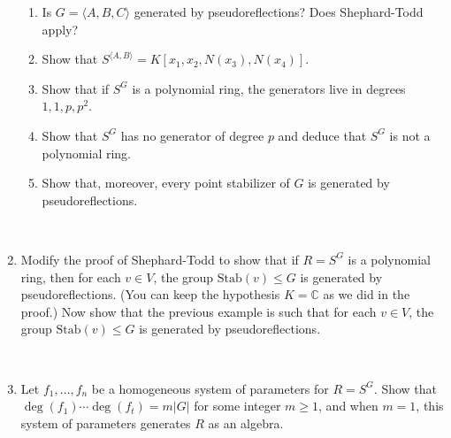 \documentclass[12pt]{amsart}
\theoremstyle{definition}
\numberwithin{equation}{theorem}
\def\CC{\mathbb{C}}
\begin{document}
\begin{enumerate}
\begin{enumerate}
\item Is $G=\langle A,B,C\rangle$ generated by pseudoreflections? Does Shephard-Todd apply?
\item Show that $S^{\langle A,B\rangle} = K[x_1,x_2, N(x_3), N(x_4)]$. 
\item Show that if $S^G$ is a polynomial ring, the generators live in degrees $1,1,p,p^2$.
\item Show that $S^G$ has no generator of degree $p$ and deduce that $S^G$ is not a polynomial ring.
\item Show that, moreover, every point stabilizer of $G$ is generated by pseudoreflections.
\end{enumerate}


\

\item Modify the proof of Shephard-Todd to show that if $R=S^G$ is a polynomial ring, then for each $v\in V$, the group $\mathrm{Stab}(v) \leq G$ is generated by pseudoreflections. (You can keep the hypothesis $K=\CC$ as we did in the proof.) Now show that the previous example is such that for each $v\in V$, the group $\mathrm{Stab}(v) \leq G$ is generated by pseudoreflections.

\

\item Let $f_1,\dots,f_n$ be a homogeneous system of parameters for $R=S^G$. Show that \\ ${\deg(f_1) \cdots \deg(f_t) = m |G|}$ for some integer $m\geq 1$, and when $m=1$, this system of parameters generates $R$ as an algebra.

\end{enumerate}
\end{document}
